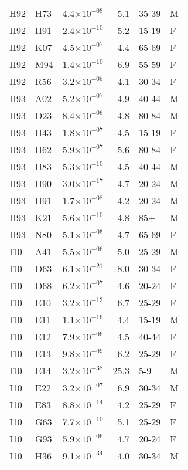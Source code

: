 \begin{longtable}{lllrll}
   H92 & H73 & 4.4$\times10^{-08}$ & 5.1 & 35-39 & M \\ 
   H92 & H91 & 2.4$\times10^{-10}$ & 5.2 & 15-19 & F \\ 
   H92 & K07 & 4.5$\times10^{-07}$ & 4.4 & 65-69 & F \\ 
   H92 & M94 & 1.4$\times10^{-10}$ & 6.9 & 55-59 & F \\ 
   H92 & R56 & 3.2$\times10^{-05}$ & 4.1 & 30-34 & F \\ 
   H93 & A02 & 5.2$\times10^{-07}$ & 4.9 & 40-44 & M \\ 
   H93 & D23 & 8.4$\times10^{-06}$ & 4.8 & 80-84 & M \\ 
   H93 & H43 & 1.8$\times10^{-07}$ & 4.5 & 15-19 & F \\ 
   H93 & H62 & 5.9$\times10^{-07}$ & 5.6 & 80-84 & F \\ 
   H93 & H83 & 5.3$\times10^{-10}$ & 4.5 & 40-44 & M \\ 
   H93 & H90 & 3.0$\times10^{-17}$ & 4.7 & 20-24 & M \\ 
   H93 & H91 & 1.7$\times10^{-08}$ & 4.2 & 20-24 & M \\ 
   H93 & K21 & 5.6$\times10^{-10}$ & 4.8 & 85+ & M \\ 
   H93 & N80 & 5.1$\times10^{-05}$ & 4.7 & 65-69 & F \\ 
   I10 & A41 & 5.5$\times10^{-06}$ & 5.0 & 25-29 & M \\ 
   I10 & D63 & 6.1$\times10^{-21}$ & 8.0 & 30-34 & F \\ 
   I10 & D68 & 6.2$\times10^{-07}$ & 4.6 & 20-24 & F \\ 
   I10 & E10 & 3.2$\times10^{-13}$ & 6.7 & 25-29 & F \\ 
   I10 & E11 & 1.1$\times10^{-16}$ & 4.4 & 15-19 & M \\ 
   I10 & E12 & 7.9$\times10^{-06}$ & 4.5 & 40-44 & F \\ 
   I10 & E13 & 9.8$\times10^{-09}$ & 6.2 & 25-29 & F \\ 
   I10 & E14 & 3.2$\times10^{-38}$ & 25.3 & 5-9 & M \\ 
   I10 & E22 & 3.2$\times10^{-07}$ & 6.9 & 30-34 & M \\ 
   I10 & E83 & 8.8$\times10^{-14}$ & 4.2 & 25-29 & F \\ 
   I10 & G63 & 7.7$\times10^{-10}$ & 5.1 & 25-29 & F \\ 
   I10 & G93 & 5.9$\times10^{-06}$ & 4.7 & 20-24 & F \\ 
   I10 & H36 & 9.1$\times10^{-34}$ & 4.0 & 30-34 & M \\ 

\end{longtable}
